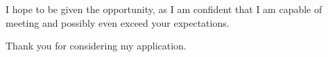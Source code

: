I hope to be given the opportunity, as I am confident that I am capable of meeting and possibly even exceed your expectations.

Thank you for considering my application.







	{\bfseries \firstname~\familyname}\\
%
\vfill%

